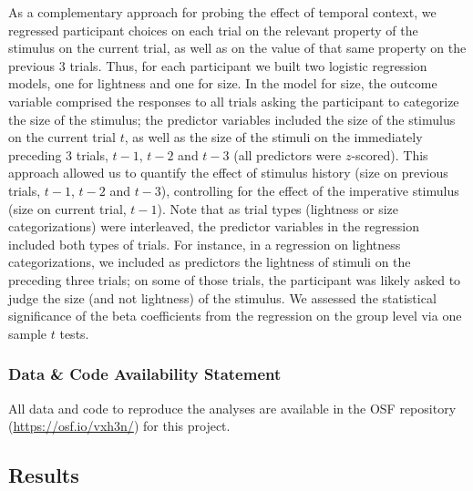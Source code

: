 \documentclass[a4paper, nobind]{templates/ociamthesis}
\begin{document}
As a complementary approach for probing the effect of temporal context, we regressed participant choices on each trial on the relevant property of the stimulus on the current trial, as well as on the value of that same property on the previous 3 trials. Thus, for each participant we built two logistic regression models, one for lightness and one for size. In the model for size, the outcome variable comprised the responses to all trials asking the participant to categorize the size of the stimulus; the predictor variables included the size of the stimulus on the current trial \(t\), as well as the size of the stimuli on the immediately preceding 3 trials, \(t-1\), \(t-2\) and \(t-3\) (all predictors were \(z\)-scored). This approach allowed us to quantify the effect of stimulus history (size on previous trials, \(t-1\), \(t-2\) and \(t-3\)), controlling for the effect of the imperative stimulus (size on current trial, \(t-1\)). Note that as trial types (lightness or size categorizations) were interleaved, the predictor variables in the regression included both types of trials. For instance, in a regression on lightness categorizations, we included as predictors the lightness of stimuli on the preceding three trials; on some of those trials, the participant was likely asked to judge the size (and not lightness) of the stimulus. We assessed the statistical significance of the beta coefficients from the regression on the group level via one sample \(t\) tests.

\hypertarget{data-code-availability-statement-4}{%
\subsubsection{Data \& Code Availability Statement}\label{data-code-availability-statement-4}}

All data and code to reproduce the analyses are available in the OSF repository (\url{https://osf.io/vxh3n/}) for this project.

\hypertarget{results-6}{%
\subsection{Results}\label{results-6}}
\end{document}
